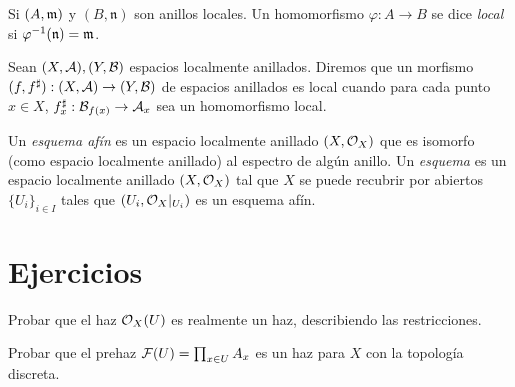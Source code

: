 \documentclass[GA.tex]{subfiles}
\begin{document}
\begin{defi}
Si $(A, {\mathfrak{m}})$ y $(B,\mathfrak{n})$ son anillos locales. Un homomorfismo $\varphi:A\to B$ se dice \emph{local} si $\varphi^{-1}(\mathfrak{n})={\mathfrak{m}}$. 
\end{defi}

\begin{defi}
Sean $(X,\mathcal{A}), (Y,\mathcal{B})$ espacios localmente anillados. Diremos que un morfismo $(f,f^{\sharp}):(X,\mathcal{A})\to (Y,\mathcal{B})$ de espacios anillados es local cuando para cada punto $x\in X$, $f^{\sharp}_x:\mathcal{B}_{f(x)}\to\mathcal{A}_x$ sea un homomorfismo local. 
\end{defi}

\begin{defi}
Un \emph{esquema afín} es un espacio localmente anillado $(X,{\mathcal O}_X)$ que es isomorfo (como espacio localmente anillado) al espectro de algún anillo. Un \emph{esquema} es un espacio localmente anillado $(X,{\mathcal O}_X)$ tal que $X$ se puede recubrir por abiertos $\{U_i\}_{i\in I}$ tales que $(U_i,{\mathcal O}_X|_{U_i})$ es un esquema afín. 
\end{defi}



\section{Ejercicios}
\begin{ejer}
Probar que el haz ${\mathcal O}_X(U)$ es realmente un haz, describiendo las restricciones. 
\end{ejer}
\begin{ejer}
Probar que el prehaz $\mathcal{F}(U)=\prod_{x\in U} A_x$ es un haz para $X$ con la topología discreta. 
\end{ejer}
\end{document}
